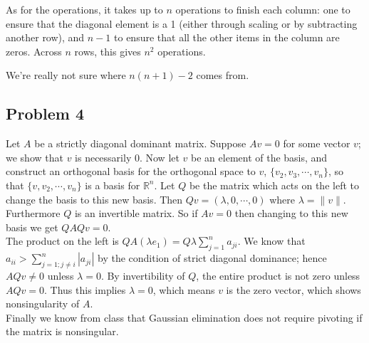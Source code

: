 \documentclass{article}
\begin{document}
As for the operations, it takes up to $n$ operations to finish each column:
one to ensure that the diagonal element is a 1 (either through scaling or by
subtracting another row), and $n-1$ to ensure that all the other items in the
column are zeros. Across $n$ rows, this gives $n^2$ operations.

We're really not sure where $n(n+1) - 2$ comes from.

\subsection{Problem 4}
Let $A$ be a strictly diagonal dominant matrix. Suppose $Av=0$ for some vector $v$; we show that $v$ is necessarily 0. Now let $v$ be an element of the basis, and construct an orthogonal basis for the orthogonal space to $v$, $\{v_2,v_3,\cdots ,v_n\}$, so that $\{v,v_2,\cdots,v_n\}$ is a basis for $\mathbb{R}^n$. Let $Q$ be the matrix which acts on the left to change the basis to this new basis. Then $Qv=(\lambda , 0, \cdots ,0)$ where $\lambda = \|v\|$. Furthermore $Q$ is an invertible matrix. 
So if $Av=0$ then changing to this new basis we get $QAQv=0$.  
\\The product on the left is $QA(\lambda e_1) = Q\lambda \displaystyle\sum_{j=1}^n a_{ji}$. We know that $a_{ii} > \displaystyle\sum_{j=1; j\neq i}^n |a_{ji}|$ by the condition of strict diagonal dominance; hence $AQv\neq 0$ unless $\lambda =0$. By invertibility of $Q$, the entire product is not zero unless $AQv=0$. Thus this implies $\lambda = 0$, which means $v$ is the zero vector, which shows nonsingularity of $A$. 
\\Finally we know from class that Gaussian elimination does not require pivoting if the matrix is nonsingular.
\end{document}
